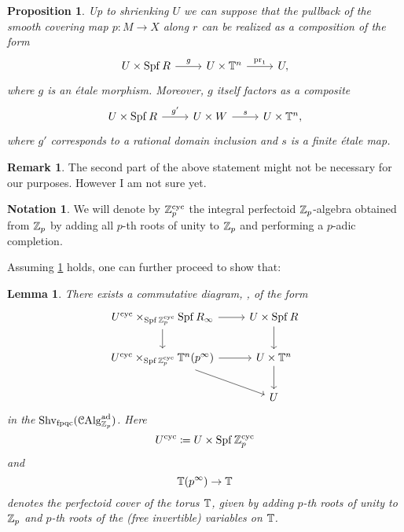 \documentclass[10pt,a4paper]{amsart}
\numberwithin{equation}{subsection}
\newtheorem{lemma}[theorem]{Lemma}
\newtheorem{proposition}[theorem]{Proposition}
\theoremstyle{definition}
\newtheorem{remark}[theorem]{Remark}
\newtheorem{notation}[theorem]{Notation}
\begin{document}

\begin{proposition} \label{stat_1} Up to shrienking $U$ we can suppose that the pullback of the smooth covering map $p \colon M \to X$ along $r$ can be realized as a composition of the form
    \[
    \begin{tikzcd}
        U \times \Spf R \ar{r}{g} & U \times \bT^n \ar{r}{\pr} & U ,
    \end{tikzcd}
    \]
where $g$ is an \'etale morphism. Moreover, $g$ itself factors as a composite
    \[
    \begin{tikzcd}
            U \times \Spf R \ar{r}{g'} & U \times W \ar{r}{s} & U \times \bT^n,
    \end{tikzcd}  
    \]
where $g'$ corresponds to a rational domain inclusion and $s$ is a finite \'etale map.
\end{proposition}

\begin{remark}
    The second part of the above statement might not be necessary for our purposes. However I am not sure yet.
\end{remark}

\begin{notation}
    We will denote by $\mathbb Z_p^{\mathrm{cyc}}$ the integral perfectoid $\mathbb Z_p$-algebra obtained from $\mathbb Z_p$ by adding all $p$-th roots of unity to $\mathbb Z_p$ and performing a $p$-adic completion.
\end{notation}
Assuming \cref{stat_1} holds, one can further proceed to show that:


\begin{lemma}
    There exists a commutative diagram, , of the form
    \begin{equation}
    \begin{tikzcd} \label{diag_chain_pulls}
            U^\cyc \times_{\Spf \cycbZp} \Spf R_\infty \ar{r} \ar{d} & U \times \Spf R \ar{d} \\  
            U^\cyc \times_{\Spf \cycbZp} \bT^n(p^\infty) \ar{r} \ar{rd} & U \times \bT^n \ar{d} \\
             & U
    \end{tikzcd}
    \end{equation}
    in the \infcat $\mathrm{Shv}_{\mathrm{fpqc}}(\mathcal C \mathrm{Alg}^{\mathrm{ad}}_{\mathbb Z_p})$. Here 
        \[
            U^{\mathrm{cyc}} \coloneqq U \times \operatorname{Spf} \mathbb Z_p^{\mathrm{cyc}}
        \]
    and 
         \[
            \mathbb T(p^\infty) \to \mathbb T 
        \]
        denotes the perfectoid cover of the torus $\mathbb T$, given by adding $p$-th roots of unity to $\mathbb Z_p$ and $p$-th roots of the (free invertible) variables on $\mathbb T$.
\end{lemma}
\end{document}
